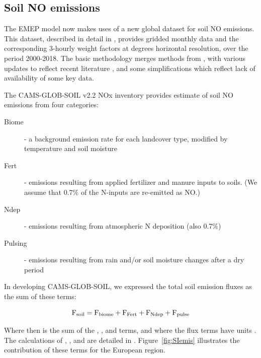 \subsection{Soil NO emissions}
\label{ssec:soilNO}

The EMEP model now makes uses of a new global dataset for soil NO
emissions. This dataset, described in detail in \citet{SimpsonDarras:2021},
provides gridded monthly data and the corresponding 3-hourly
weight factors at  degrees horizontal resolution, over
the period 2000-2018.  The basic methodology merges methods from
\citet{YiengerLevy:1995}, with various updates to reflect recent
literature \citep[especially][]{SteinkampLawrence2011}, and some
simplifications which reflect lack of  availability of some key data.

The CAMS-GLOB-SOIL v2.2 NOx inventory
provides estimate of soil NO emissions from four categories:

\begin{description}
  \item[Biome] - a background emission rate for each landcover type, modified by temperature
and soil moisture %
  \item[Fert] - emissions resulting from applied fertilizer and manure inputs to soils. (We assume
that  0.7\% of the N-inputs are re-emitted as NO.)
  \item[Ndep] - emissions resulting from atmospheric N deposition (also 0.7\%)
  \item[Pulsing] - emissions resulting from rain and/or soil moisture changes after
    a dry period
\end{description}

In developing CAMS-GLOB-SOIL, we expressed the total soil emission fluxes as the sum of these terms:

\begin{equation}
  \mbox{F}_{\scriptsize \mbox{soil}} = \mbox{F}_{\scriptsize \mbox{biome}}  + \mbox{F}_{\scriptsize \mbox{Fert}} + \mbox{F}_{\scriptsize \mbox{Ndep}} + \mbox{F}_{\scriptsize \mbox{pulse}}
  \label{eqn:Fs}
\end{equation}

Where \Fn then is the sum of the \Fb, \Fd, and \Fp terms, and where the
flux terms have units \ngN. The calculations of \Fb, \Ff, \Fd and \Fp
are detailed in \citet{SimpsonDarras:2021}.
Figure~\ref{fig:SIemis} illustrates the contribution of these terms for
the European region. 
%

